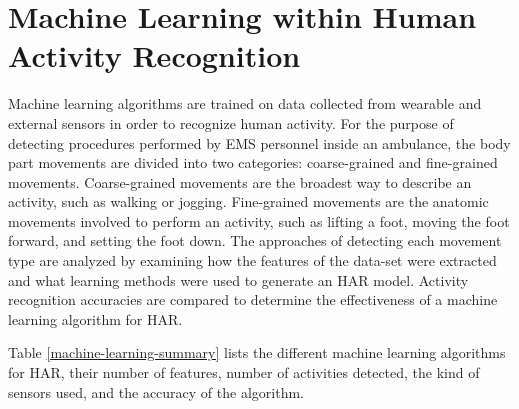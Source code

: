 \section{Machine Learning within Human Activity Recognition}
\label{sec:Literature-Review:Machine-Learning-Classifiers}
Machine learning algorithms are trained on data collected from wearable and external sensors in order to recognize human activity. For the purpose of detecting procedures performed by EMS personnel inside an ambulance, the body part movements are divided into two categories: coarse-grained and fine-grained movements. Coarse-grained movements are the broadest way to describe an activity, such as walking or jogging. Fine-grained movements are the anatomic movements involved to perform an activity, such as lifting a foot, moving the foot forward, and setting the foot down. The approaches of detecting each movement type are analyzed by examining how the features of the data-set were extracted and what learning methods were used to generate an HAR model. Activity recognition accuracies are compared to determine the effectiveness of a machine learning algorithm for \gls{HAR}.
\par Table \ref{machine-learning-summary} lists the different machine learning algorithms for HAR, their number of features, number of activities detected, the kind of sensors used, and the accuracy of the algorithm.
